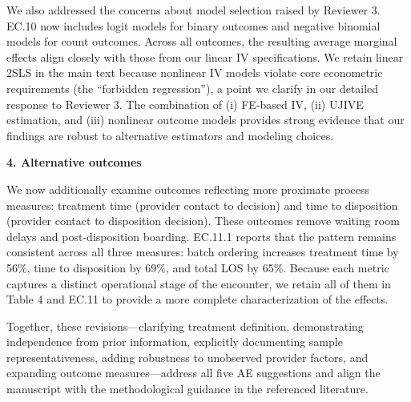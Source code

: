 \documentclass[11pt]{article}
\newcommand{\1}{\hbox{\rm 1\kern-.35em 1}}
\begin{document}
We also addressed the concerns about model selection raised by Reviewer 3. EC.10 now includes logit models for binary outcomes and negative binomial models for count outcomes. Across all outcomes, the resulting average marginal effects align closely with those from our linear IV specifications. We retain linear 2SLS in the main text because nonlinear IV models violate core econometric requirements (the ``forbidden regression''), a point we clarify in our detailed response to Reviewer 3. The combination of (i) FE-based IV, (ii) UJIVE estimation, and (iii) nonlinear outcome models provides strong evidence that our findings are robust to alternative estimators and modeling choices.

\textbf{4. Alternative outcomes}

We now additionally examine outcomes reflecting more proximate process measures: treatment time (provider contact to decision) and time to disposition (provider contact to disposition decision). These outcomes remove waiting room delays and post-disposition boarding. EC.11.1 reports that the pattern remains consistent across all three measures: batch ordering increases treatment time by 56\%, time to disposition by 69\%, and total LOS by 65\%. Because each metric captures a distinct operational stage of the encounter, we retain all of them in Table 4 and EC.11 to provide a more complete characterization of the effects.

Together, these revisions—clarifying treatment definition, demonstrating independence from prior information, explicitly documenting sample representativeness, adding robustness to unobserved provider factors, and expanding outcome measures—address all five AE suggestions and align the manuscript with the methodological guidance in the referenced literature.
\color{black}



\clearpage


\pagestyle{fancy}
\fancyhead{}
\renewcommand{\headrulewidth}{0pt}
\end{document}
